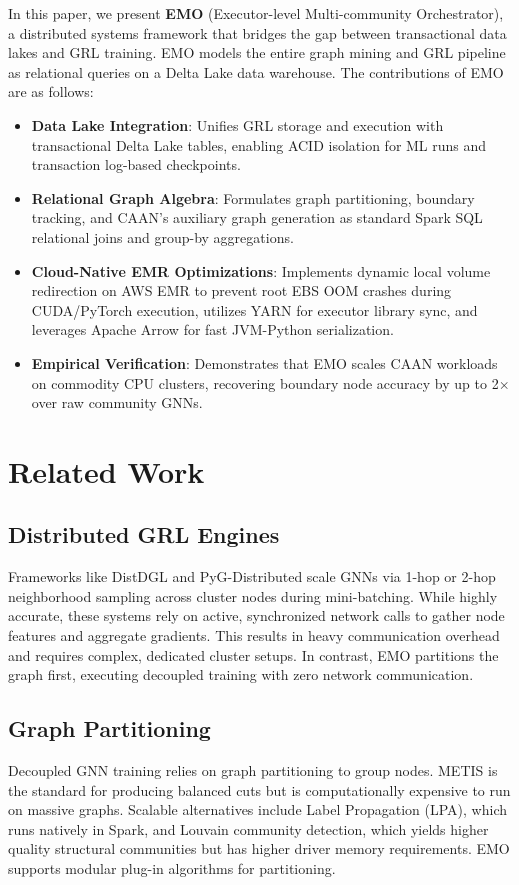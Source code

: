 \documentclass[conference,compsoc]{IEEEtran}
\begin{document}
In this paper, we present \textbf{EMO} (Executor-level Multi-community Orchestrator), a distributed systems framework that bridges the gap between transactional data lakes and GRL training. EMO models the entire graph mining and GRL pipeline as relational queries on a Delta Lake data warehouse. The contributions of EMO are as follows:
\begin{itemize}
    \item \textbf{Data Lake Integration}: Unifies GRL storage and execution with transactional Delta Lake tables, enabling ACID isolation for ML runs and transaction log-based checkpoints.
    \item \textbf{Relational Graph Algebra}: Formulates graph partitioning, boundary tracking, and CAAN's auxiliary graph generation as standard Spark SQL relational joins and group-by aggregations.
    \item \textbf{Cloud-Native EMR Optimizations}: Implements dynamic local volume redirection on AWS EMR to prevent root EBS OOM crashes during CUDA/PyTorch execution, utilizes YARN for executor library sync, and leverages Apache Arrow for fast JVM-Python serialization.
    \item \textbf{Empirical Verification}: Demonstrates that EMO scales CAAN workloads on commodity CPU clusters, recovering boundary node accuracy by up to 2$\times$ over raw community GNNs.
\end{itemize}

\section{Related Work}
\subsection{Distributed GRL Engines}
Frameworks like DistDGL and PyG-Distributed scale GNNs via 1-hop or 2-hop neighborhood sampling across cluster nodes during mini-batching. While highly accurate, these systems rely on active, synchronized network calls to gather node features and aggregate gradients. This results in heavy communication overhead and requires complex, dedicated cluster setups. In contrast, EMO partitions the graph first, executing decoupled training with zero network communication.

\subsection{Graph Partitioning}
Decoupled GNN training relies on graph partitioning to group nodes. METIS is the standard for producing balanced cuts but is computationally expensive to run on massive graphs. Scalable alternatives include Label Propagation (LPA), which runs natively in Spark, and Louvain community detection, which yields higher quality structural communities but has higher driver memory requirements. EMO supports modular plug-in algorithms for partitioning.
\end{document}
